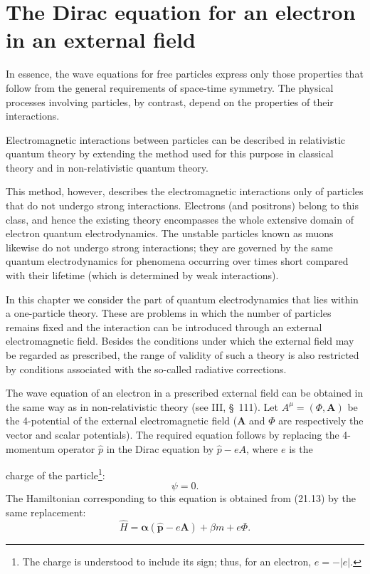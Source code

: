 
\section{The Dirac equation for an electron in an external field}

In essence, the wave equations for free particles express only those properties that follow from the general requirements of space-time symmetry. The physical processes involving particles, by contrast, depend on the properties of their interactions.

Electromagnetic interactions between particles can be described in relativistic quantum theory by extending the method used for this purpose in classical theory and in non-relativistic quantum theory.

This method, however, describes the electromagnetic interactions only of particles that do not undergo strong interactions. Electrons (and positrons) belong to this class, and hence the existing theory encompasses the whole extensive domain of electron quantum electrodynamics. The unstable particles known as muons likewise do not undergo strong interactions; they are governed by the same quantum electrodynamics for phenomena occurring over times short compared with their lifetime (which is determined by weak interactions).

In this chapter we consider the part of quantum electrodynamics that lies within a one-particle theory. These are problems in which the number of particles remains fixed and the interaction can be introduced through an external electromagnetic field. Besides the conditions under which the external field may be regarded as prescribed, the range of validity of such a theory is also restricted by conditions associated with the so-called radiative corrections.

The wave equation of an electron in a prescribed external field can be obtained in the same way as in non-relativistic theory (see III, \S~111). Let $A^\mu=(\Phi,\mathbf A)$ be the 4-potential of the external electromagnetic field ($\mathbf A$ and $\Phi$ are respectively the vector and scalar potentials). The required equation follows by replacing the 4-momentum operator $\hat p$ in the Dirac equation by $\hat p-eA$, where $e$ is the

charge of the particle\footnote{The charge is understood to include its sign; thus, for an electron, $e=-|e|$.}:
\begin{equation}
[\gamma(\hat p-eA)-m]\psi=0.
\tag{32.1}
\end{equation}
The Hamiltonian corresponding to this equation is obtained from (21.13) by the same replacement:
\begin{equation}
\widehat H=\boldsymbol\alpha(\widehat{\mathbf p}-e\mathbf A)+\beta m+e\Phi.
\tag{32.2}
\end{equation}

